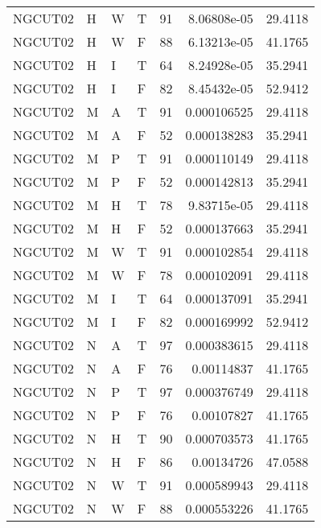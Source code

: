 \begin{longtable}{llllrrr}
    NGCUT02  & H     & W     & T          & 91         & 8.06808e-05 & 29.4118  \\
    NGCUT02  & H     & W     & F          & 88         & 6.13213e-05 & 41.1765  \\
    NGCUT02  & H     & I     & T          & 64         & 8.24928e-05 & 35.2941  \\
    NGCUT02  & H     & I     & F          & 82         & 8.45432e-05 & 52.9412  \\
    NGCUT02  & M     & A     & T          & 91         & 0.000106525 & 29.4118  \\
    NGCUT02  & M     & A     & F          & 52         & 0.000138283 & 35.2941  \\
    NGCUT02  & M     & P     & T          & 91         & 0.000110149 & 29.4118  \\
    NGCUT02  & M     & P     & F          & 52         & 0.000142813 & 35.2941  \\
    NGCUT02  & M     & H     & T          & 78         & 9.83715e-05 & 29.4118  \\
    NGCUT02  & M     & H     & F          & 52         & 0.000137663 & 35.2941  \\
    NGCUT02  & M     & W     & T          & 91         & 0.000102854 & 29.4118  \\
    NGCUT02  & M     & W     & F          & 78         & 0.000102091 & 29.4118  \\
    NGCUT02  & M     & I     & T          & 64         & 0.000137091 & 35.2941  \\
    NGCUT02  & M     & I     & F          & 82         & 0.000169992 & 52.9412  \\
    NGCUT02  & N     & A     & T          & 97         & 0.000383615 & 29.4118  \\
    NGCUT02  & N     & A     & F          & 76         & 0.00114837  & 41.1765  \\
    NGCUT02  & N     & P     & T          & 97         & 0.000376749 & 29.4118  \\
    NGCUT02  & N     & P     & F          & 76         & 0.00107827  & 41.1765  \\
    NGCUT02  & N     & H     & T          & 90         & 0.000703573 & 41.1765  \\
    NGCUT02  & N     & H     & F          & 86         & 0.00134726  & 47.0588  \\
    NGCUT02  & N     & W     & T          & 91         & 0.000589943 & 29.4118  \\
    NGCUT02  & N     & W     & F          & 88         & 0.000553226 & 41.1765  \\

\end{longtable}
